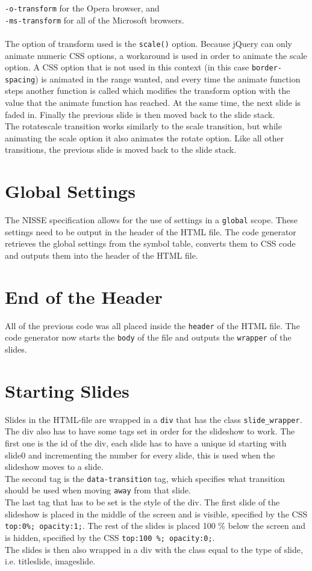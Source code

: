 \texttt{-o-transform} for the Opera browser, and \\
\texttt{-ms-transform} for all of the Microsoft browsers. \\ \\
The option of transform used is the \texttt{scale()} option. Because jQuery can only animate numeric CSS options, a workaround is used in order to animate the scale option. A CSS option that is not used in this context (in this case \texttt{border-spacing}) is animated in the range wanted, and every time the animate function steps another function is called which modifies the transform option with the value that the animate function has reached. At the same time, the next slide is faded in. Finally the previous slide is then moved back to the slide stack. \\
The rotatescale transition works similarly to the scale transition, but while animating the scale option it also animates the rotate option. Like all other transitions, the previous slide is moved back to the slide stack.

\section{Global Settings}
The NISSE specification allows for the use of settings in a \texttt{global} scope. These settings need to be output in the header of the HTML file. The code generator retrieves the global settings from the symbol table, converts them to CSS code and outputs them into the header of the HTML file.

\section{End of the Header}
All of the previous code was all placed inside the \texttt{header} of the HTML file. The code generator now starts the \texttt{body} of the file and outputs the \texttt{wrapper} of the slides.

\section{Starting Slides}
Slides in the HTML-file are wrapped in a \texttt{div} that has the class \texttt{slide\_wrapper}. The div also has to have some tags set in order for the slideshow to work. The first one is the id of the div, each slide has to have a unique id starting with slide0 and incrementing the number for every slide, this is used when the slideshow moves to a slide. \\
The second tag is the \texttt{data-transition} tag, which specifies what transition should be used when moving \texttt{away} from that slide. \\
The last tag that has to be set is the style of the div. The first slide of the slideshow is placed in the middle of the screen and is visible, specified by the CSS \texttt{top:0\%; opacity:1;}. The rest of the slides is placed 100 \% below the screen and is hidden, specified by the CSS \texttt{top:100 \%; opacity:0;}. \\
The slides is then also wrapped in a div with the class equal to the type of slide, i.e. titleslide, imageslide.

